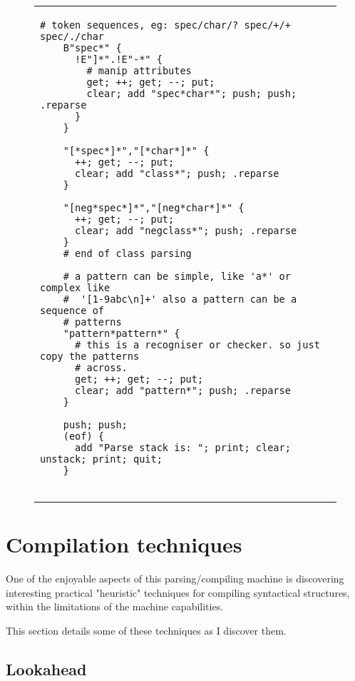 \documentclass[a4paper,12pt]{article}
\begin{document}
\begin{figure}
\begin{tabular}{ l }
\begin{lstlisting}[breaklines]
    # token sequences, eg: spec/char/? spec/+/+ spec/./char
    B"spec*" {
      !E"]*".!E"-*" {
        # manip attributes
        get; ++; get; --; put;
        clear; add "spec*char*"; push; push; .reparse
      }
    }
    
    "[*spec*]*","[*char*]*" {
      ++; get; --; put;
      clear; add "class*"; push; .reparse
    }

    "[neg*spec*]*","[neg*char*]*" {
      ++; get; --; put;
      clear; add "negclass*"; push; .reparse
    }
    # end of class parsing

    # a pattern can be simple, like 'a*' or complex like 
    #  '[1-9abc\n]+' also a pattern can be a sequence of 
    # patterns
    "pattern*pattern*" {
      # this is a recogniser or checker. so just copy the patterns
      # across.
      get; ++; get; --; put;
      clear; add "pattern*"; push; .reparse
    }
    
    push; push;
    (eof) {
      add "Parse stack is: "; print; clear; unstack; print; quit;
    }
  
 \end{lstlisting} 
 \end{tabular} 

 \end{figure}

\section{Compilation techniques}

  One of the enjoyable aspects of this parsing/compiling machine is
  discovering interesting practical "heuristic" techniques for
  compiling syntactical structures, within the limitations of the
  machine capabilities.

  This section details some of these techniques as I discover them.

\subsection{Lookahead}
\end{document}
